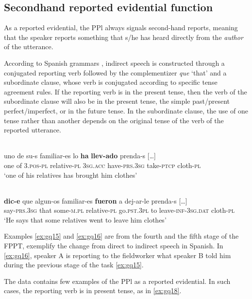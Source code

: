 \documentclass[output=paper]{langsci/langscibook}
\begin{document}
\subsection{Secondhand reported evidential function}\label{s:gq4-2}

As a reported evidential, the PPl always signals second-hand reports, meaning that the speaker reports something that s/he has heard directly from the \textit{author} of the utterance.

According to Spanish grammars \citep{Maldonado1999}, indirect speech is constructed through a conjugated reporting verb followed by the complementizer \textit{que} ‘that’ and a subordinate clause, whose verb is conjugated according to specific tense agreement rules. If the reporting verb is in the present tense, then the verb of the subordinate clause will also be in the present tense, the simple past/present perfect/imperfect, or in the future tense. In the subordinate clause, the use of one tense rather than another depends on the original tense of the verb of the reported utterance.

\ea \label{ex:gq15}
\\
	\gll[…] uno de su-s familiar-es lo \textbf{ha} \textbf{llev-ado} prenda-s […]\\
	{} one of \textsc{3.pos}-\textsc{pl} relative-\textsc{pl} \textsc{3sg.acc} have-\textsc{prs.3sg} take-\textsc{ptcp} cloth-\textsc{pl} {}\\
	\glt ‘one of his relatives has brought him clothes’
\z	

\ea \label{ex:gq16}
\\
	\gll […] \textbf{dic-e} que algun-os familiar-es \textbf{fueron} a dej-ar-le prenda-s […]\\
	{} say-\textsc{prs.3sg} that some-\textsc{m.pl} relative-\textsc{pl} go.\textsc{pst.3pl} to leave-\textsc{inf-3sg.dat} cloth-\textsc{pl} {}\\
	\glt ‘He says that some relatives went to leave him clothes’
\z

Examples \ref{ex:gq15} and \ref{ex:gq16} are from the fourth and the fifth stage of the FPPT, exemplify the change from direct to indirect speech in Spanish. In \ref{ex:gq16}, speaker A is reporting to the fieldworker what speaker B told him during the previous stage of the task \ref{ex:gq15}.

The data contains few examples of the PPl as a reported evidential. In such cases, the reporting verb is in present tense, as in \ref{ex:gq18}. 
\end{document}
